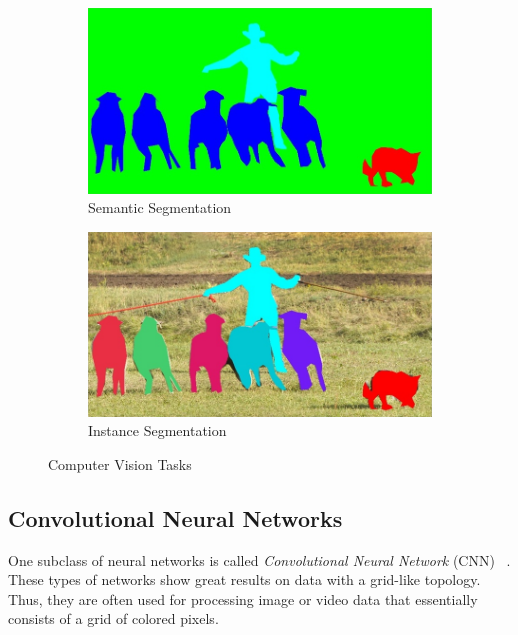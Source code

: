 \begin{figure}
    \hfill
    \begin{subfigure}{\VisionTasksImageWidth}
        \includegraphics[width=\textwidth]{images/vision_task_3}
        \caption{Semantic Segmentation}
        \label{fig:cv_task_semseg}
    \end{subfigure}
    \hfill
    \begin{subfigure}{\VisionTasksImageWidth}
        \includegraphics[width=\textwidth]{images/vision_task_4}
        \caption{Instance Segmentation}
        \label{fig:cv_task_inseg}
    \end{subfigure}
    \hfill

    \caption{Computer Vision Tasks~\cite{coco15}}
    \label{fig:cv_tasks}
\end{figure}

\subsection{Convolutional Neural Networks}
\label{sec:cnn}

One subclass of neural networks is called \emph{Convolutional Neural Network} (CNN) ~\cite[p.~359]{praxiseinstieg_ml17}. These types of networks show great results on data with a grid-like topology. Thus, they are often used for processing image or video data that essentially consists of a grid of colored pixels.

